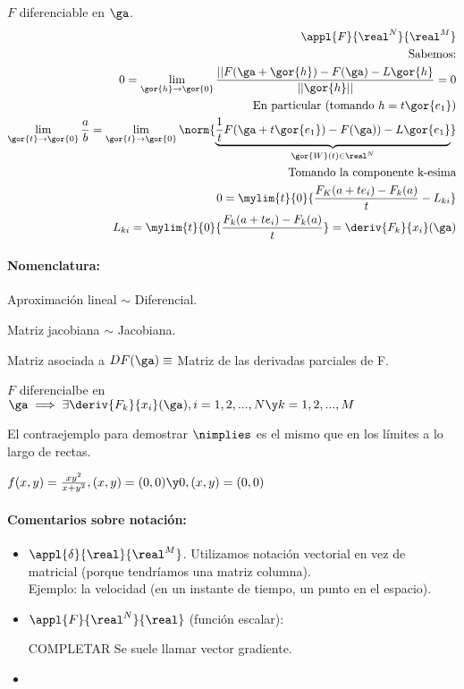 \documentclass[a4paper,10pt]{apuntes}
\begin{document}
\obs
$F$ diferenciable en $\ga$.
\begin{align*}
\appl{F}{\real^N}{\real^M}\\
\text{Sabemos:}\\
 0 = \lim_{\gor{h} \rightarrow \gor{0}} \frac{||F(\ga+\gor{h}) - F(\ga) - L\gor{h}}{||\gor{h}||} = 0 \\
 \text{En particular (tomando } h = t \gor{e_1})\\
 \lim_{\gor{t} \rightarrow \gor{0}}\frac{a}{b} = \lim_{\gor{t} \rightarrow \gor{0}}\norm{\underbrace{\frac{1}{t} F(\ga+t\gor{e_1})-F(\ga))-L\gor{e_1}}_{\gor{W}(t)\in\real^N}}\\
 \text{Tomando la componente k-esima}\\
 0 = \mylim{t}{0}{\frac{F_K(a+te_i)-F_k(a)}{t} - L_{ki}}\\
 L_{ki} = \mylim{t}{0} {\frac{F_k(a+te_i) - F_k(a)}{t}} = \deriv{ F_k}{x_i}(\ga)
\end{align*}

\paragraph{Nomenclatura: }
Aproximación lineal $\sim$ Diferencial.

Matriz jacobiana $\sim$ Jacobiana.

\begin{theorem}
 Matriz asociada a $DF(\ga) \equiv $ Matriz de las derivadas parciales de F.
 
                  
\end{theorem}

\begin{theorem}
 $F$ diferencialbe en $\ga \implies \exists \deriv{F_k}{x_i}(\ga), i=1,2,...,N \y k = 1,2,...,M$
\end{theorem}

El contraejemplo para demostrar $\nimplies$ es el mismo que en los límites a lo largo de rectas.

$f(x,y) = \frac{xy^2}{x+y^2}, (x,y) = (0,0) \y 0, (x,y)=(0,0)$

\paragraph{Comentarios sobre notación: }
\begin{itemize}
 \item $\appl{\delta}{\real}{\real^M}$. Utilizamos notación vectorial en vez de matricial (porque tendríamos una matriz columna).\\
 Ejemplo: la velocidad (en un instante de tiempo, un punto en el espacio).
 \item $\appl{F}{\real^N}{\real}$ (función escalar):

 COMPLETAR
 Se suele llamar vector gradiente.
 \item 
\end{itemize}
\end{document}
